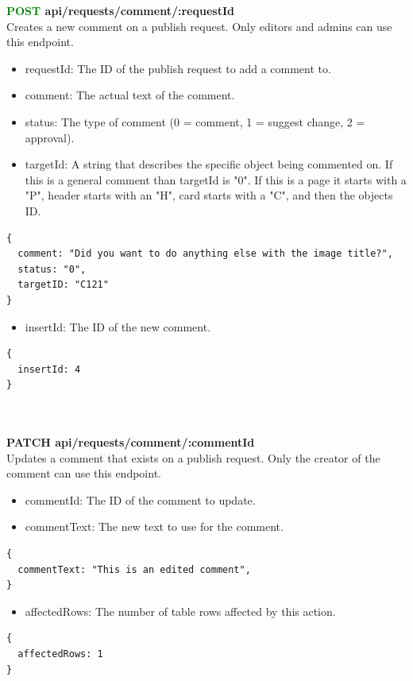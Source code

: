 \documentclass[onecolumn, draftclsnofoot,10pt, compsoc, usenames, dvipsnames]{IEEEtran}
\begin{document}
\noindent
\textbf{\textcolor{Green}{POST} api/requests/comment/:requestId} \\
Creates a new comment on a publish request. Only editors and admins can use this endpoint.
\begin{itemize}
    \item requestId: The ID of the publish request to add a comment to.
    \item comment: The actual text of the comment.
    \item status: The type of comment (0 = comment, 1 = suggest change, 2 = approval).
    \item targetId: A string that describes the specific object being commented on. If this is a general comment than targetId is "0". If this is a page it starts with a "P", header starts with an "H", card starts with a "C", and then the objects ID.
\end{itemize}
\begin{lstlisting}[caption=Example Request Body]
{ 
  comment: "Did you want to do anything else with the image title?",
  status: "0",
  targetID: "C121"
}
\end{lstlisting}
\begin{itemize}
    \item insertId: The ID of the new comment.
\end{itemize}
\begin{lstlisting}[caption=Example Response]
{
  insertId: 4
}
\end{lstlisting}
\\~\\


\noindent
\textbf{\textcolor{BlueGreen}{PATCH} api/requests/comment/:commentId} \\
Updates a comment that exists on a publish request. Only the creator of the comment can use this endpoint.
\begin{itemize}
    \item commentId: The ID of the comment to update.
    \item commentText: The new text to use for the comment.
\end{itemize}
\begin{lstlisting}[caption=Example Request Body]
{
  commentText: "This is an edited comment",
}
\end{lstlisting}
\begin{itemize}
  \item affectedRows: The number of table rows affected by this action.
\end{itemize}
\begin{lstlisting}[caption=Example Response]
{ 
  affectedRows: 1
}
\end{lstlisting}
\\~\\
\end{document}
